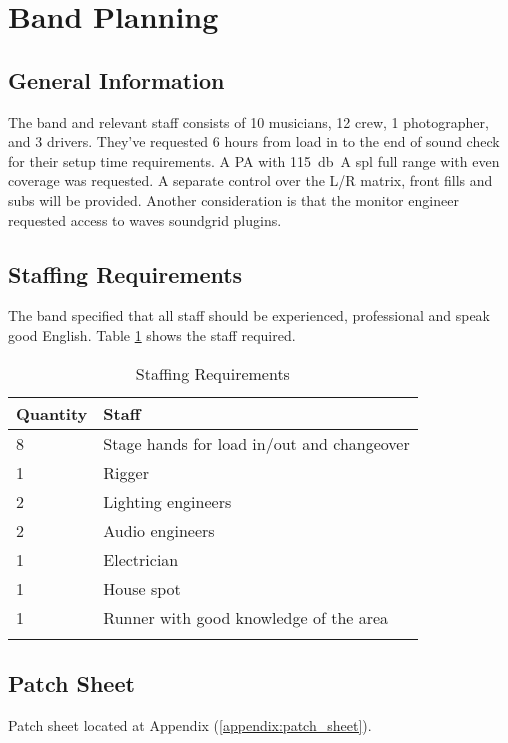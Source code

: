 \section{Band Planning}
    \subsection{General Information}
    The band and relevant staff consists of 10 musicians, 12 crew, 1 photographer, and 3 drivers. They've requested 6 hours from load in to the end of sound check for their setup time requirements. A PA with \SI{115}{\decibel\A} \gls{spl} full range with even coverage was requested. A separate control over the L/R matrix, front fills and subs will be provided. Another consideration is that the monitor engineer requested access to waves soundgrid plugins.

    \subsection{Staffing Requirements}
    The band specified that all staff should be experienced, professional and speak good English. Table \ref{tab:staffing} shows the staff required.

    \begin{longtable}[H]{|l|l|}
        \hline
        \textbf{Quantity} & \textbf{Staff} \\ \hline
        \endfirsthead
        \endhead
        8 & Stage hands for load in/out and changeover \\ \hline
        1 & Rigger \\ \hline
        2 & Lighting engineers \\ \hline
        2 & Audio engineers \\ \hline
        1 & Electrician \\ \hline
        1 & House spot \\ \hline
        1 & Runner with good knowledge of the area \\ \hline

        \caption{Staffing Requirements}
        \label{tab:staffing}
    \end{longtable}
    
    \subsection{Patch Sheet}
    Patch sheet located at Appendix (\ref{appendix:patch_sheet}). 

